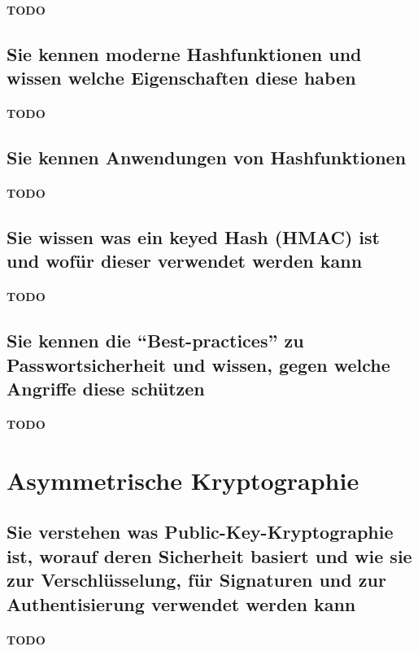 \documentclass[10pt,a4paper]{article}
\begin{document}
\paragraph*{TODO}
\subsection*{Sie kennen moderne Hashfunktionen und wissen welche Eigenschaften diese haben}
\paragraph*{TODO}
\subsection*{Sie kennen Anwendungen von Hashfunktionen}
\paragraph*{TODO}
\subsection*{Sie wissen was ein keyed Hash (HMAC) ist und wofür dieser verwendet werden kann}
\paragraph*{TODO}
\subsection*{Sie kennen die "`Best-practices"' zu Passwortsicherheit und wissen, gegen welche Angriffe diese schützen}
\paragraph*{TODO}


\section{Asymmetrische Kryptographie}
\subsection*{Sie verstehen was Public-Key-Kryptographie ist, worauf deren Sicherheit basiert und wie sie zur Verschlüsselung, für Signaturen und zur Authentisierung verwendet werden kann}
\paragraph*{TODO}
\end{document}
